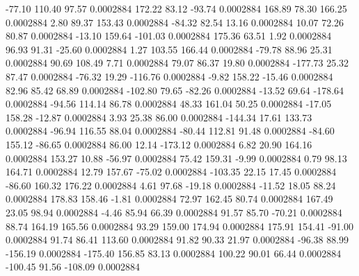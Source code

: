       -77.10      110.40       97.57     0.0002884
      172.22       83.12      -93.74     0.0002884
      168.89       78.30      166.25     0.0002884
        2.80       89.37      153.43     0.0002884
      -84.32       82.54       13.16     0.0002884
       10.07       72.26       80.87     0.0002884
      -13.10      159.64     -101.03     0.0002884
      175.36       63.51        1.92     0.0002884
       96.93       91.31      -25.60     0.0002884
        1.27      103.55      166.44     0.0002884
      -79.78       88.96       25.31     0.0002884
       90.69      108.49        7.71     0.0002884
       79.07       86.37       19.80     0.0002884
     -177.73       25.32       87.47     0.0002884
      -76.32       19.29     -116.76     0.0002884
       -9.82      158.22      -15.46     0.0002884
       82.96       85.42       68.89     0.0002884
     -102.80       79.65      -82.26     0.0002884
      -13.52       69.64     -178.64     0.0002884
      -94.56      114.14       86.78     0.0002884
       48.33      161.04       50.25     0.0002884
      -17.05      158.28      -12.87     0.0002884
        3.93       25.38       86.00     0.0002884
     -144.34       17.61      133.73     0.0002884
      -96.94      116.55       88.04     0.0002884
      -80.44      112.81       91.48     0.0002884
      -84.60      155.12      -86.65     0.0002884
       86.00       12.14     -173.12     0.0002884
        6.82       20.90      164.16     0.0002884
      153.27       10.88      -56.97     0.0002884
       75.42      159.31       -9.99     0.0002884
        0.79       98.13      164.71     0.0002884
       12.79      157.67      -75.02     0.0002884
     -103.35       22.15       17.45     0.0002884
      -86.60      160.32      176.22     0.0002884
        4.61       97.68      -19.18     0.0002884
      -11.52       18.05       88.24     0.0002884
      178.83      158.46       -1.81     0.0002884
       72.97      162.45       80.74     0.0002884
      167.49       23.05       98.94     0.0002884
       -4.46       85.94       66.39     0.0002884
       91.57       85.70      -70.21     0.0002884
       88.74      164.19      165.56     0.0002884
       93.29      159.00      174.94     0.0002884
      175.91      154.41      -91.00     0.0002884
       91.74       86.41      113.60     0.0002884
       91.82       90.33       21.97     0.0002884
      -96.38       88.99     -156.19     0.0002884
     -175.40      156.85       83.13     0.0002884
      100.22       90.01       66.44     0.0002884
     -100.45       91.56     -108.09     0.0002884
